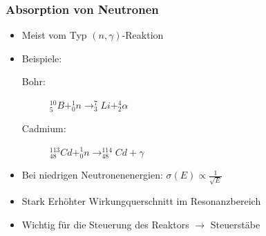 \documentclass{beamer}[9pt]
\begin{document}
\begin{frame}
\frametitle{Absorption von Neutronen}
\begin{itemize}
\item Meist vom Typ $(n,\gamma)$-Reaktion
\item Beispiele:
\begin{description}
\item[Bohr:] $^{10}_5B + ^1_0n \rightarrow ^{7}_3Li + ^4_2\alpha$
\vspace{0.2cm}
\item[Cadmium:] $^{113}_{48}Cd + ^1_0n \rightarrow ^{114}_{48}Cd + \gamma$
\end{description}
\vspace{0.2cm}
\item Bei niedrigen Neutronenenergien: $\sigma(E) \propto  \frac{1}{\sqrt{E}}$
\item Stark Erhöhter Wirkungquerschnitt im Resonanzbereich
\item Wichtig für die Steuerung des Reaktors $\rightarrow$ Steuerstäbe
\end{itemize}
\end{frame}
\end{document}
